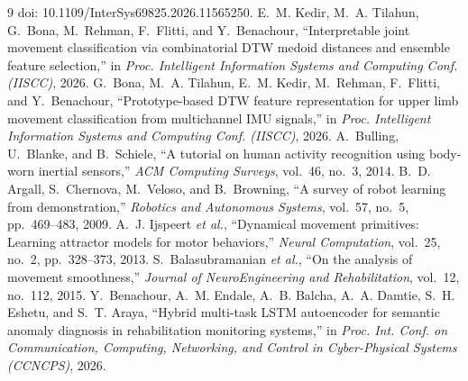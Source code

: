 \documentclass[conference]{IEEEtran}
\begin{document}
\begin{thebibliography}{9}
doi: 10.1109/InterSys69825.2026.11565250.
 E.~M. Kedir, M.~A. Tilahun, G.~Bona, M.~Rehman,
F.~Flitti, and Y.~Benachour, ``Interpretable joint movement
classification via combinatorial DTW medoid distances and ensemble
feature selection,'' in \emph{Proc. Intelligent Information Systems
and Computing Conf. (IISCC)}, 2026.
 G.~Bona, M.~A. Tilahun, E.~M. Kedir, M.~Rehman,
F.~Flitti, and Y.~Benachour, ``Prototype-based DTW feature
representation for upper limb movement classification from
multichannel IMU signals,'' in \emph{Proc. Intelligent Information
Systems and Computing Conf. (IISCC)}, 2026.
 A.~Bulling, U.~Blanke, and B.~Schiele, ``A
tutorial on human activity recognition using body-worn inertial
sensors,'' \emph{ACM Computing Surveys}, vol.~46, no.~3, 2014.
 B.~D. Argall, S.~Chernova, M.~Veloso, and
B.~Browning, ``A survey of robot learning from demonstration,''
\emph{Robotics and Autonomous Systems}, vol.~57, no.~5, pp.~469--483,
2009.
 A.~J. Ijspeert \emph{et al.}, ``Dynamical
movement primitives: Learning attractor models for motor behaviors,''
\emph{Neural Computation}, vol.~25, no.~2, pp.~328--373, 2013.
 S.~Balasubramanian \emph{et al.}, ``On
the analysis of movement smoothness,'' \emph{Journal of
NeuroEngineering and Rehabilitation}, vol.~12, no.~112, 2015.
 Y.~Benachour, A.~M. Endale, A.~B. Balcha,
A.~A. Damtie, S.~H. Eshetu, and S.~T. Araya, ``Hybrid multi-task LSTM
autoencoder for semantic anomaly diagnosis in rehabilitation
monitoring systems,'' in \emph{Proc. Int. Conf. on Communication,
Computing, Networking, and Control in Cyber-Physical Systems
(CCNCPS)}, 2026.
\end{thebibliography}
\end{document}
